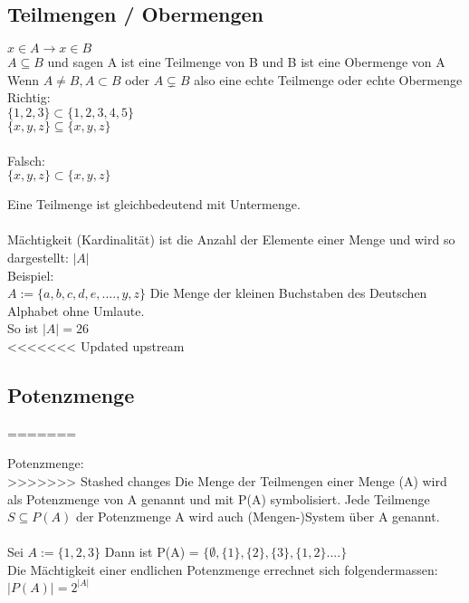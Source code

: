 \documentclass[../gruppenarbeit_1.tex]{subfiles}
\begin{document}
\subsection{Teilmengen / Obermengen}

$x \in A \rightarrow x \in B$\\
$A \subseteq B$ und sagen A ist eine Teilmenge von B und B ist eine Obermenge von A\\

Wenn $A \ne B, A \subset B$ oder $A \subsetneq B$ also eine echte Teilmenge oder echte Obermenge\\

Richtig:\\
$\{1,2,3\} \subset \{1,2,3,4,5\}$\\
$\{x,y,z\} \subseteq \{x,y,z\}$\\
\\
Falsch: \\
$\{x,y,z\} \subset \{x,y,z\}$

Eine Teilmenge ist gleichbedeutend mit Untermenge.\\
\\

Mächtigkeit (Kardinalität) ist die Anzahl der Elemente einer Menge und wird so dargestellt: $|A|$\\

Beispiel:\\
$A := \{a,b,c,d,e,....,y,z\}$ Die Menge der kleinen Buchstaben des Deutschen Alphabet ohne Umlaute.\\
So ist $|A| = 26$\\

<<<<<<< Updated upstream
\subsection{Potenzmenge}
=======
\newpage

Potenzmenge:\\
>>>>>>> Stashed changes
Die Menge der Teilmengen einer Menge (A) wird als Potenzmenge von A genannt und mit P(A) symbolisiert.
Jede Teilmenge $S \subseteq P(A)$ der Potenzmenge A wird auch (Mengen-)System über A genannt.\\
\\
Sei $A := \{1,2,3\}$ Dann ist P(A) = $\{\emptyset, \{1\},\{2\},\{3\},\{1,2\}....\}$\\
Die Mächtigkeit einer endlichen Potenzmenge errechnet sich folgendermassen:\\
$|P(A)| = 2^{|A|}$\\
\\
\end{document}

